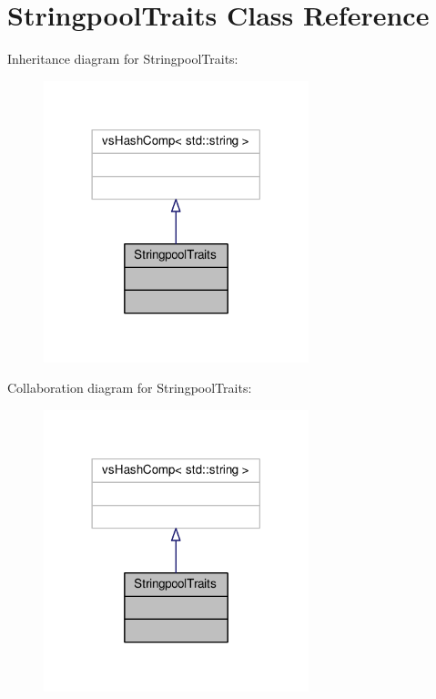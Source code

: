 \hypertarget{classStringpoolTraits}{}\section{Stringpool\+Traits Class Reference}
\label{classStringpoolTraits}


Inheritance diagram for Stringpool\+Traits\+:
\nopagebreak
\begin{figure}[H]
\begin{center}
\leavevmode
\includegraphics[width=218pt]{d2/dc1/classStringpoolTraits__inherit__graph}
\end{center}
\end{figure}


Collaboration diagram for Stringpool\+Traits\+:
\nopagebreak
\begin{figure}[H]
\begin{center}
\leavevmode
\includegraphics[width=218pt]{d6/d4b/classStringpoolTraits__coll__graph}
\end{center}
\end{figure}

